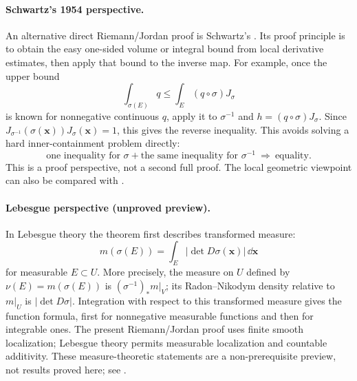 \paragraph{Schwartz's 1954 perspective.}
An alternative direct Riemann/Jordan proof is Schwartz's
\cite{schwartz-change}. Its proof principle is to obtain the easy
one-sided volume or integral bound from local derivative estimates,
then apply that bound to the inverse map. For example, once the upper
bound
\[
\int_{\sigma(E)}q\leq\int_E(q\circ\sigma)J_\sigma
\]
 is known for
nonnegative continuous $q$, apply it to $\sigma^{-1}$ and
$h=(q\circ\sigma)J_\sigma$. Since
$J_{\sigma^{-1}}(\sigma(\mathbf{x}))J_\sigma(\mathbf{x})=1$, this gives the reverse inequality.
This avoids solving a hard inner-containment problem directly:
\[
\boxed{\text{one inequality for }\sigma
+\text{the same inequality for }\sigma^{-1}
\ \Longrightarrow\ \text{equality}.}
\]
This is a proof perspective, not a second full proof. The local geometric
viewpoint can also be compared with \cite{pugh-analysis,bartle-elements}.

\paragraph{Lebesgue perspective (unproved preview).}
In Lebesgue theory the theorem first describes transformed measure:
\[
m(\sigma(E))=\int_E |\det D\sigma(\mathbf{x})|\,\dd\mathbf{x}
\]
for measurable $E\subset U$. More precisely, the measure on $U$ defined
by $\nu(E)=m(\sigma(E))$ is $(\sigma^{-1})_*m|_V$; its Radon--Nikodym
density relative to $m|_U$ is $|\det D\sigma|$. Integration with respect
to this transformed measure gives the function formula, first for
nonnegative measurable functions and then for integrable ones. The
present Riemann/Jordan proof uses finite smooth localization; Lebesgue
theory permits measurable localization and countable additivity.
These measure-theoretic statements are a non-prerequisite preview,
not results proved here; see \cite{knapp-basic-real}.

